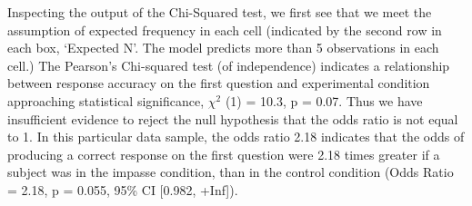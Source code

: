 \documentclass[
  letterpaper,
  DIV=11,
  numbers=noendperiod]{scrreprt}
\newenvironment{Shaded}{\begin{snugshade}}{\end{snugshade}}
\newcommand{\AttributeTok}[1]{\textcolor[rgb]{0.40,0.45,0.13}{#1}}
\newcommand{\ConstantTok}[1]{\textcolor[rgb]{0.56,0.35,0.01}{#1}}
\newcommand{\DecValTok}[1]{\textcolor[rgb]{0.68,0.00,0.00}{#1}}
\newcommand{\FunctionTok}[1]{\textcolor[rgb]{0.28,0.35,0.67}{#1}}
\newcommand{\NormalTok}[1]{\textcolor[rgb]{0.00,0.23,0.31}{#1}}
\newcommand{\OtherTok}[1]{\textcolor[rgb]{0.00,0.23,0.31}{#1}}
\newcommand{\SpecialCharTok}[1]{\textcolor[rgb]{0.37,0.37,0.37}{#1}}
\newcommand{\StringTok}[1]{\textcolor[rgb]{0.13,0.47,0.30}{#1}}
\begin{document}
Inspecting the output of the Chi-Squared test, we first see that we meet
the assumption of expected frequency in each cell (indicated by the
second row in each box, `Expected N'. The model predicts more than 5
observations in each cell.) The Pearson's Chi-squared test (of
independence) indicates a relationship between response accuracy on the
first question and experimental condition approaching statistical
significance, \(\chi^2\) (1) = 10.3, p = 0.07. Thus we have insufficient
evidence to reject the null hypothesis that the odds ratio is not equal
to 1. In this particular data sample, the odds ratio 2.18 indicates that
the odds of producing a correct response on the first question were 2.18
times greater if a subject was in the impasse condition, than in the
control condition (Odds Ratio = 2.18, p = 0.055, 95\% CI {[}0.982,
+Inf{]}).

\begin{Shaded}
\end{Shaded}
\end{document}
